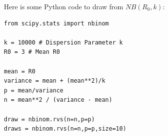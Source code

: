 \documentclass[11pt]{article}
\begin{document}
\begin{enumerate}
\clearpage
Here is some Python code to draw from $NB(R_0, k)$:
\begin{verbatim}
from scipy.stats import nbinom

k = 10000 # Dispersion Parameter k
R0 = 3 # Mean R0

mean = R0
variance = mean + (mean**2)/k
p = mean/variance
n = mean**2 / (variance - mean) 

draw = nbinom.rvs(n=n,p=p)
draws = nbinom.rvs(n=n,p=p,size=10)
\end{verbatim}



\end{enumerate}
\end{document}
